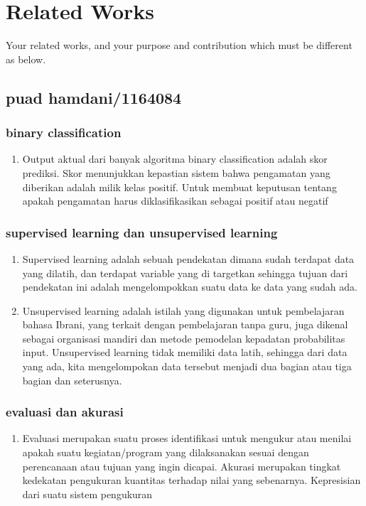 \chapter{Related Works}

Your related works, and your purpose and contribution which must be different as below.


\section{puad hamdani/1164084}
\subsection{binary classification }
\begin{enumerate}
\item Output aktual dari banyak algoritma binary classification adalah skor prediksi. Skor menunjukkan kepastian sistem bahwa pengamatan yang diberikan adalah milik kelas positif. Untuk membuat keputusan tentang apakah pengamatan harus diklasifikasikan sebagai positif atau negatif
\end{enumerate}

\subsection{supervised learning dan unsupervised learning}
\begin{enumerate}
\item Supervised learning adalah sebuah pendekatan dimana sudah terdapat data yang dilatih, dan terdapat variable yang di targetkan sehingga tujuan dari pendekatan ini adalah mengelompokkan suatu data ke data yang sudah ada.


\item Unsupervised learning adalah istilah yang digunakan untuk pembelajaran bahasa Ibrani, yang terkait dengan pembelajaran tanpa guru, juga dikenal sebagai organisasi mandiri dan metode pemodelan kepadatan probabilitas input. Unsupervised learning tidak memiliki data latih, sehingga dari data yang ada, kita mengelompokan data tersebut menjadi dua bagian atau tiga bagian dan seterusnya.
\end{enumerate}

\subsection{evaluasi dan akurasi }
\begin{enumerate}
\item Evaluasi merupakan suatu proses identifikasi untuk mengukur atau menilai apakah suatu kegiatan/program yang dilaksanakan sesuai dengan perencanaan atau tujuan yang ingin dicapai.
Akurasi merupakan tingkat kedekatan pengukuran kuantitas terhadap nilai yang sebenarnya. Kepresisian dari suatu sistem pengukuran
\end{enumerate}

